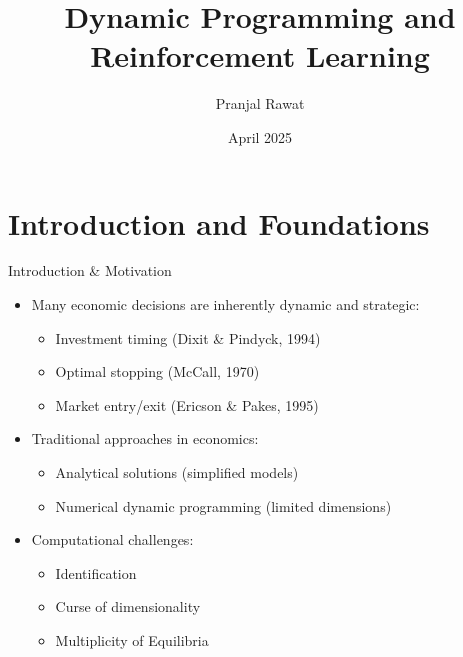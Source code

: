 \documentclass[10pt]{beamer}
\title{Dynamic Programming and Reinforcement Learning}
\date{April 2025}
\author{Pranjal Rawat}
\institute{Georgetown University}
\begin{document}
\maketitle


\section{Introduction and Foundations}


\begin{frame}{Introduction \& Motivation}
    \begin{itemize}
        \item Many economic decisions are inherently dynamic and strategic: 
        \begin{itemize}
            \item Investment timing (Dixit \& Pindyck, 1994)
            \item Optimal stopping (McCall, 1970)
            \item Market entry/exit (Ericson \& Pakes, 1995)
        \end{itemize}
        \vspace{0.2cm}
        \item Traditional approaches in economics:
        \begin{itemize}
            \item Analytical solutions (simplified models)
            \item Numerical dynamic programming (limited dimensions)
        \end{itemize}
        \vspace{0.2cm}
        \item Computational challenges:
        \begin{itemize}
            \item Identification
            \item Curse of dimensionality
            \item Multiplicity of Equilibria
        \end{itemize}
    \end{itemize}
\end{frame}
\end{document}
